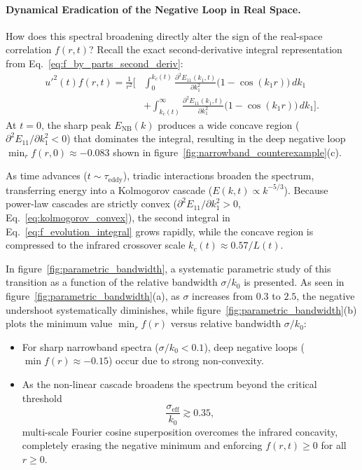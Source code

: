 \documentclass[lineno]{jfm}
\begin{document}
\paragraph{Dynamical Eradication of the Negative Loop in Real Space.}
How does this spectral broadening directly alter the sign of the real-space correlation $f(r, t)$? Recall the exact second-derivative integral representation from Eq.~\eqref{eq:f_by_parts_second_deriv}:
\begin{align}
u'^2(t) f(r, t) = \frac{1}{r^2} \Bigg[ &\int_0^{k_c(t)} \frac{\partial^2 E_{11}(k_1, t)}{\partial k_1^2} \big(1 - \cos(k_1 r)\big)\,dk_1 \nonumber \\
&+ \int_{k_c(t)}^\infty \frac{\partial^2 E_{11}(k_1, t)}{\partial k_1^2} \big(1 - \cos(k_1 r)\big)\,dk_1 \Bigg].
\label{eq:f_evolution_integral}
\end{align}
At $t = 0$, the sharp peak $E_{\text{NB}}(k)$ produces a wide concave region ($\partial^2 E_{11}/\partial k_1^2 < 0$) that dominates the integral, resulting in the deep negative loop $\min_r f(r, 0) \approx -0.083$ shown in figure~\ref{fig:narrowband_counterexample}(c). 

As time advances ($t \sim \tau_{\text{eddy}}$), triadic interactions broaden the spectrum, transferring energy into a Kolmogorov cascade ($E(k,t) \propto k^{-5/3}$). Because power-law cascades are strictly convex ($\partial^2 E_{11}/\partial k_1^2 > 0$, Eq.~\eqref{eq:kolmogorov_convex}), the second integral in Eq.~\eqref{eq:f_evolution_integral} grows rapidly, while the concave region is compressed to the infrared crossover scale $k_c(t) \approx 0.57/L(t)$.

In figure~\ref{fig:parametric_bandwidth}, a systematic parametric study of this transition as a function of the relative bandwidth $\sigma/k_0$ is presented. As seen in figure~\ref{fig:parametric_bandwidth}(a), as $\sigma$ increases from $0.3$ to $2.5$, the negative undershoot systematically diminishes, while figure~\ref{fig:parametric_bandwidth}(b) plots the minimum value $\min_r f(r)$ versus relative bandwidth $\sigma/k_0$:
\begin{itemize}
\item For sharp narrowband spectra ($\sigma/k_0 < 0.1$), deep negative loops ($\min f(r) \approx -0.15$) occur due to strong non-convexity.
\item As the non-linear cascade broadens the spectrum beyond the critical threshold
\begin{equation}
\frac{\sigma_{\text{eff}}}{k_0} \gtrsim 0.35,
\label{eq:bandwidth_threshold}
\end{equation}
multi-scale Fourier cosine superposition overcomes the infrared concavity, completely erasing the negative minimum and enforcing $f(r, t) \ge 0$ for all $r \ge 0$.
\end{itemize}
\end{document}
